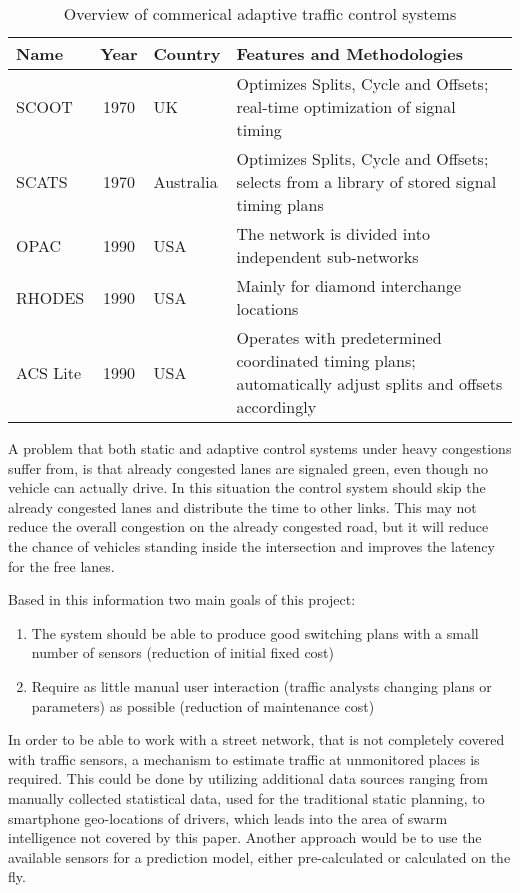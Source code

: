 \begin{table}[ht!]
	\centering
	\begin{tabular}{l|cl|p{9cm}}
		Name & Year & Country & Features and Methodologies \\
		\hline\hline
		SCOOT & 1970 & UK & Optimizes Splits, Cycle and Offsets; real-time optimization of signal timing \\
		\hline
		SCATS & 1970 & Australia & Optimizes Splits, Cycle and Offsets; selects from a library of stored signal timing plans \\
		\hline
		OPAC & 1990 & USA & The network is divided into independent sub-networks \\
		\hline
		RHODES & 1990 & USA & Mainly for diamond interchange locations \\
		\hline
		ACS Lite & 1990 & USA & Operates with predetermined coordinated timing plans; automatically adjust splits and offsets accordingly \\
	\end{tabular}
	\label{atcs_overview}
	\caption{Overview of commerical adaptive traffic control systems}
\end{table}

A problem that both static and adaptive control systems under heavy congestions suffer from, is that already congested lanes are signaled green, even though no vehicle can actually drive. In this situation the control system should skip the already congested lanes and distribute the time to other links. This may not reduce the overall congestion on the already congested road, but it will reduce the chance of vehicles standing inside the intersection and improves the latency for the free lanes.

Based in this information two main goals of this project:

\begin{enumerate}
	\item The system should be able to produce good switching plans with a small number of sensors (reduction of initial fixed cost)
	\item Require as little manual user interaction (traffic analysts changing plans or parameters) as possible (reduction of maintenance cost)
\end{enumerate}

In order to be able to work with a street network, that is not completely covered with traffic sensors, a mechanism to estimate traffic at unmonitored places is required. This could be done by utilizing additional data sources ranging from manually collected statistical data, used for the traditional static planning, to smartphone geo-locations of drivers, which leads into the area of swarm intelligence not covered by this paper. Another approach would be to use the available sensors for a prediction model, either pre-calculated or calculated on the fly.

